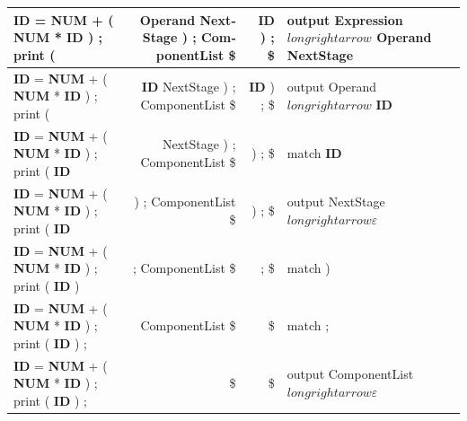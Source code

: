 \documentclass{article}
\begin{document}
\begin{latin}
\begin{table}[H]
{\begin{tabular}{|l|r|r|l|}
\textbf{ID} = \textbf{NUM} + ( \textbf{NUM} * \textbf{ID} ) ; print (                 & Operand NextStage ) ; ComponentList \$      & \textbf{ID} ) ; \$                                                                       & output Expression $longrightarrow$ Operand NextStage            \\ \hline
\textbf{ID} = \textbf{NUM} + ( \textbf{NUM} * \textbf{ID} ) ; print (                 & \textbf{ID} NextStage ) ; ComponentList \$  & \textbf{ID} ) ; \$                                                                       & output Operand $longrightarrow$ \textbf{ID}                     \\ \hline
\textbf{ID} = \textbf{NUM} + ( \textbf{NUM} * \textbf{ID} ) ; print ( \textbf{ID}     & NextStage ) ; ComponentList \$              & ) ; \$                                                                                   & match \textbf{ID}                                               \\ \hline
\textbf{ID} = \textbf{NUM} + ( \textbf{NUM} * \textbf{ID} ) ; print ( \textbf{ID}     & ) ; ComponentList \$                        & ) ; \$                                                                                   & output NextStage $longrightarrow \varepsilon$                   \\ \hline
\textbf{ID} = \textbf{NUM} + ( \textbf{NUM} * \textbf{ID} ) ; print ( \textbf{ID} )   & ; ComponentList \$                          & ; \$                                                                                     & match )                                                         \\ \hline
\textbf{ID} = \textbf{NUM} + ( \textbf{NUM} * \textbf{ID} ) ; print ( \textbf{ID} ) ; & ComponentList \$                            & \$                                                                                       & match ;                                                         \\ \hline
\textbf{ID} = \textbf{NUM} + ( \textbf{NUM} * \textbf{ID} ) ; print ( \textbf{ID} ) ; & \$                                          & \$                                                                                       & output ComponentList $longrightarrow \varepsilon$               \\ \hline
\end{tabular}%
}
\end{table}
\end{latin}
\end{document}
